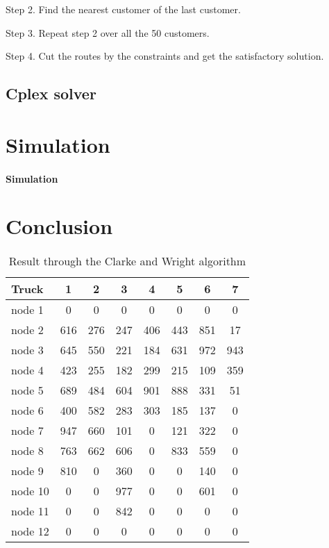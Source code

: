 \documentclass[12pt]{article}
\numberwithin{equation}{section}
\begin{document}
Step 2. Find the nearest customer of the last customer.

Step 3. Repeat step 2 over all the 50 customers.

Step 4. Cut the routes by the constraints and get the satisfactory solution.
			
		\subsection{Cplex solver} 
		
		
\section{Simulation}\label{simu}
	\paragraph{Simulation}	

\section{Conclusion}\label{conclution}
	
\begin{table}[htbp]
  \centering
  \caption{Result through the Clarke and Wright algorithm}
    \begin{tabular}{lccccccc}
    \hline
    Truck & 1     & 2     & 3     & 4     & 5     & 6     & 7 \\
    \hline
    node 1 & 0     & 0     & 0     & 0     & 0     & 0     & 0 \\
    node 2 & 616   & 276   & 247   & 406   & 443   & 851   & 17 \\
    node 3 & 645   & 550   & 221   & 184   & 631   & 972   & 943 \\
    node 4 & 423   & 255   & 182   & 299   & 215   & 109   & 359 \\
    node 5 & 689   & 484   & 604   & 901   & 888   & 331   & 51 \\
    node 6 & 400   & 582   & 283   & 303   & 185   & 137   & 0 \\
    node 7 & 947   & 660   & 101   & 0     & 121   & 322   & 0 \\
    node 8 & 763   & 662   & 606   & 0     & 833   & 559   & 0 \\
    node 9 & 810   & 0     & 360   & 0     & 0     & 140   & 0 \\
    node 10 & 0     & 0     & 977   & 0     & 0     & 601   & 0 \\
    node 11 & 0     & 0     & 842   & 0     & 0     & 0     & 0 \\
    node 12 & 0     & 0     & 0     & 0     & 0     & 0     & 0 \\
    \hline
    \end{tabular}%
  \label{tab:CW}%
\end{table}%
\end{document}
